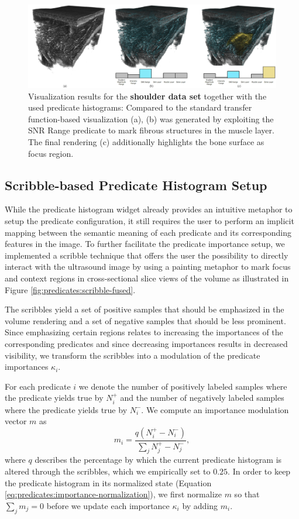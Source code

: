 \begin{figure}[ht]
	\centering
	\includegraphics[width=0.95\linewidth]{figures/predicates/shoulder.jpg}
	\caption{
		Visualization results for the \textbf{shoulder data set} together with the used predicate histograms: 
		Compared to the standard transfer function-based visualization (a), (b) was generated by exploiting the SNR Range predicate to mark fibrous structures in the muscle layer. 
		The final rendering (c) additionally highlights the bone surface as focus region.
	}
	\label{fig:predicates:results-shoulder}
\end{figure}


\subsection{Scribble-based Predicate Histogram Setup}

While the predicate histogram widget already provides an intuitive metaphor to setup the predicate configuration, it still requires the user to perform an implicit mapping between the semantic meaning of each predicate and its corresponding features in the image. 
To further facilitate the predicate importance setup, we implemented a scribble technique that offers the user the possibility to directly interact with the ultrasound image by using a painting metaphor to mark focus and context regions in cross-sectional slice views of the volume as illustrated in Figure \ref{fig:predicates:scribble-fused}. 


The scribbles yield a set of positive samples that should be emphasized in the volume rendering and a set of negative samples that should be less prominent. 
Since emphasizing certain regions relates to increasing the importances of the corresponding predicates and since decreasing importances results in decreased visibility, we transform the scribbles into a modulation of the predicate importances $\kappa_i$. 

For each predicate $i$ we denote the number of positively labeled samples where the predicate yields true by $N^+_i$ and the number of negatively labeled samples where the predicate yields true by $N^-_i$. 
We compute an importance modulation vector $m$ as
\begin{equation}
	m_i = \frac{q \left(N^+_i - N^-_i \right)}{\sum_j N^+_j - N^-_j},
\end{equation}
where $q$ describes the percentage by which the current predicate histogram is altered through the scribbles, which we empirically set to $0.25$. 
In order to keep the predicate histogram in its normalized state (Equation \eqref{eq:predicates:importance-normalization}), we first normalize $m$ so that $\sum_j m_j = 0$ before we update each importance $\kappa_i$ by adding $m_i$. 


